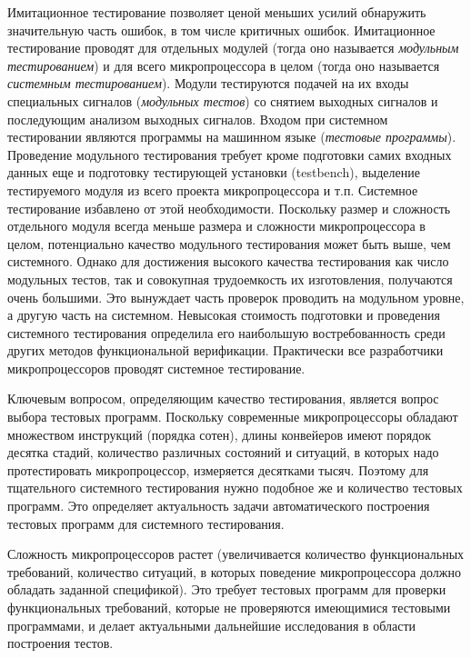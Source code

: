 {Имитационное тестирование позволяет ценой меньших усилий обнаружить значительную часть ошибок, в том числе критичных ошибок. Имитационное тестирование проводят для отдельных модулей (тогда оно называется \emph{модульным тестированием}) и для всего микропроцессора в целом (тогда оно называется \emph{системным тестированием}). Модули тестируются подачей на их входы специальных сигналов (\emph{модульных тестов}) со снятием выходных сигналов и последующим анализом выходных сигналов. Входом при системном тестировании являются программы на машинном языке (\emph{тестовые программы}). Проведение модульного тестирования требует кроме подготовки самих входных данных еще и подготовку тестирующей установки (testbench), выделение тестируемого модуля из всего проекта микропроцессора и т.п. Системное тестирование избавлено от этой необходимости. Поскольку размер и сложность отдельного модуля всегда меньше размера и сложности микропроцессора в целом, потенциально качество модульного тестирования может быть выше, чем системного. Однако для достижения высокого качества тестирования как число модульных тестов, так и совокупная трудоемкость их изготовления, получаются очень большими. Это вынуждает часть проверок проводить на модульном уровне, а другую часть на системном. Невысокая стоимость подготовки и проведения системного тестирования определила его наибольшую востребованность среди других методов функциональной верификации. Практически все разработчики микропроцессоров проводят системное тестирование.

Ключевым вопросом, определяющим качество тестирования, является вопрос выбора тестовых программ. Поскольку современные микропроцессоры обладают множеством инструкций (порядка сотен), длины конвейеров имеют порядок десятка стадий, количество различных состояний и ситуаций, в которых надо протестировать микропроцессор, измеряется десятками тысяч. Поэтому для тщательного системного тестирования нужно подобное же и количество тестовых программ. Это определяет актуальность задачи автоматического построения тестовых программ для системного тестирования.

Сложность микропроцессоров растет (увеличивается количество функциональных требований, количество ситуаций, в которых поведение микропроцессора должно обладать заданной спецификой). Это требует тестовых программ для проверки функциональных требований, которые не проверяются имеющимися тестовыми программами, и делает актуальными дальнейшие исследования в области построения тестов.


}
